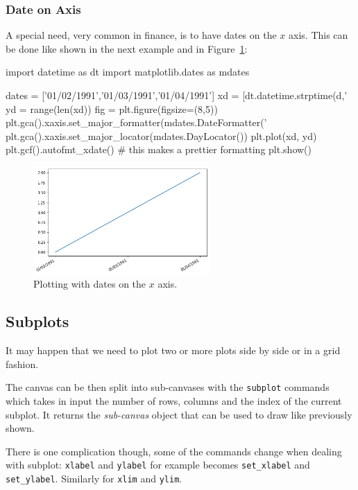 \begin{ipython}
\subsubsection{Date on Axis}\label{date-on-axis}

A special need, very common in finance, is to have dates on the \(x\)
axis. This can be done like shown in the next example and in Figure~\ref{fig:axis3}:

\begin{ipython}
import datetime as dt
import matplotlib.dates as mdates

dates = ['01/02/1991','01/03/1991','01/04/1991']
xd = [dt.datetime.strptime(d,'%
yd = range(len(xd))
fig = plt.figure(figsize=(8,5))
plt.gca().xaxis.set_major_formatter(mdates.DateFormatter('%
plt.gca().xaxis.set_major_locator(mdates.DayLocator())
plt.plot(xd, yd)
plt.gcf().autofmt_xdate() # this makes a prettier formatting
plt.show()
\end{ipython}

\begin{figure}[h]
	\centering
	\includegraphics[width=0.6\textwidth]{figures/axis3}
	\caption{Plotting with dates on the $x$ axis.}
	\label{fig:axis3}
\end{figure}

\subsection{Subplots}
\label{subplots}

It may happen that we need to plot two or more plots side by side or in
a grid fashion.

The canvas can be then split into sub-canvases with the \texttt{subplot}
commands which takes in input the number of rows, columns and the index
of the current subplot. It returns the \emph{sub-canvas} object that can
be used to draw like previously shown.

There is one complication though, some of the commands change when
dealing with subplot: \texttt{xlabel} and \texttt{ylabel} for example
becomes \texttt{set\_xlabel} and \texttt{set\_ylabel}. Similarly for
\texttt{xlim} and \texttt{ylim}.


\end{ipython}
